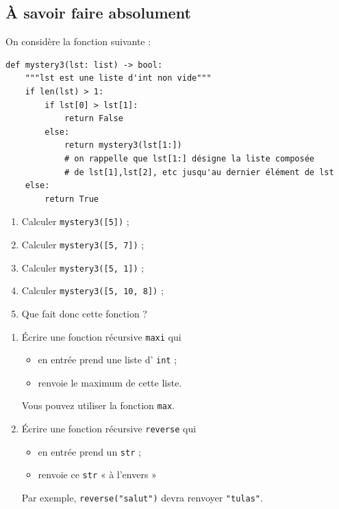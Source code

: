 \documentclass[10pt,firamath,cours]{nsi}
\begin{document}
\subsection*{À savoir faire absolument}
\begin{exercice}
	On considère la fonction suivante :
	
	
	\begin{verbatim}
def mystery3(lst: list) -> bool:
    """lst est une liste d'int non vide"""
    if len(lst) > 1:
        if lst[0] > lst[1]:
            return False
        else:
            return mystery3(lst[1:])
            # on rappelle que lst[1:] désigne la liste composée
            # de lst[1],lst[2], etc jusqu'au dernier élément de lst
    else:
        return True
\end{verbatim}
	
	
	\begin{enumerate}
		\item Calculer \texttt{mystery3([5])} ;
		\item Calculer \texttt{mystery3([5, 7])} ;
		\item Calculer \texttt{mystery3([5, 1])} ;
		\item Calculer \texttt{mystery3([5, 10, 8])} ;
		\item Que fait donc cette fonction ?
	\end{enumerate}
\end{exercice}
\begin{exercice}
	
	\begin{enumerate}
		\item \'Ecrire une fonction récursive \texttt{maxi} qui
		      \begin{itemize}
			      \item en entrée prend une liste d' \texttt{int} ;
			      \item renvoie le maximum de cette liste.
		      \end{itemize}
		      Vous pouvez utiliser la fonction \texttt{max}.
		\item \'Ecrire une fonction récursive \texttt{reverse} qui
		      \begin{itemize}
			      \item en entrée prend un \texttt{str} ;
			      \item renvoie ce \texttt{str} « à l'envers »
		      \end{itemize}
		      Par exemple, \texttt{reverse("salut")} devra renvoyer \texttt{"tulas"}.
	\end{enumerate}
\end{exercice}
\newpage 
\end{document}
